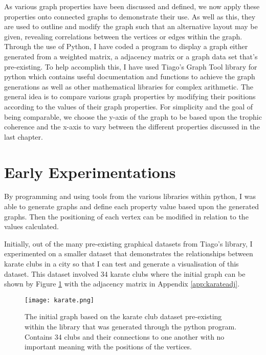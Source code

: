 As various graph properties have been discussed and defined, we now apply these properties onto connected graphs to demonstrate their use. As well as this, they are used to outline and modify the graph such that an alternative layout may be given, revealing correlations between the vertices or edges within the graph. Through the use of Python, I have coded a program to display a graph either generated from a weighted matrix, a adjacency matrix or a graph data set that's pre-existing. To help accomplish this, I have used Tiago's Graph Tool library for python which contains useful documentation and functions to achieve the graph generations as well as other mathematical libraries for complex arithmetic. The general idea is to compare various graph properties by modifying their positions according to the values of their graph properties. For simplicity and the goal of being comparable, we choose the y-axis of the graph to be based upon the trophic coherence and the x-axis to vary between the different properties discussed in the last chapter.

\section{Early Experimentations}
By programming and using tools from the various libraries within python, I was able to generate graphs and define each property value based upon the generated graphs. Then the positioning of each vertex can be modified in relation to the values calculated.

Initially, out of the many pre-existing graphical datasets from Tiago's library, I experimented on a smaller dataset that demonstrates the relationships between karate clubs in a city so that I can test and generate a visualisation of this dataset. This dataset involved 34 karate clubs where the initial graph can be shown by Figure \ref{fig:karate} with the adjacency matrix in Appendix \ref{app:karateadj}.

\begin{figure}[H]
	\centering
	\texttt{[image: karate.png]}
	\caption{The initial graph based on the karate club dataset pre-existing within the library that was generated through the python program. Contains 34 clubs and their connections to one another with no important meaning with the positions of the vertices.}
	\label{fig:karate}
\end{figure}

